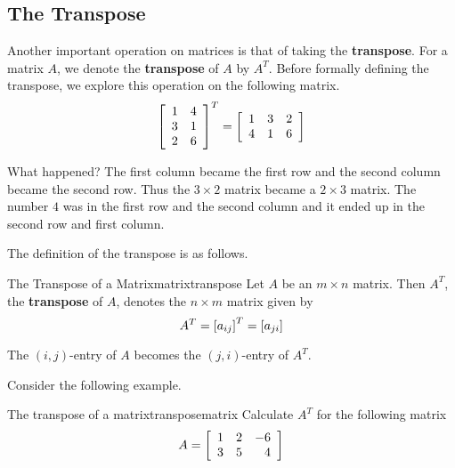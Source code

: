 \subsection{The Transpose}

Another important operation on matrices is that of taking the \textbf{transpose}. For a matrix $A$, we denote the
\textbf{transpose} of $A$ by $A^T$. Before formally defining the transpose, we explore this
operation on the following matrix.
\begin{equation*}
\left[
\begin{array}{cc}
1 & 4 \\
3 & 1 \\
2 & 6
\end{array}
\right] ^{T}=\allowbreak \left[
\begin{array}{ccc}
1 & 3 & 2 \\
4 & 1 & 6
\end{array}
\right]
\end{equation*}

What happened? The first column became the first row and the second column
became the second row. Thus the $3\times 2$ matrix became a $2\times 3$
matrix. The number $4$ was in the first row and the second column and it
ended up in the second row and first column. 

The definition of the transpose is as follows.

\begin{definition}{The Transpose of a Matrix}{matrixtranspose}
Let $A$ be an $m\times n$ matrix. Then $A^{T}$, the \textbf{transpose} of $A$,  denotes the $n\times m$
matrix given by 
\begin{equation*}
A^{T} = \left[ a _{ij}\right] ^{T}= \left[ a_{ji} \right]
\end{equation*}
\end{definition}

The $\left( i, j  \right)$-entry of $A$ becomes the 
$\left( j,i \right)$-entry of $A^T$. 

Consider the following example.

\begin{example}{The transpose of a matrix}{transposematrix}
Calculate $A^T$ for the following matrix
\begin{equation*}
A = \left[
\begin{array}{rrr}
1 & 2 & -6 \\
3 & 5 & 4
\end{array}
\right]
\end{equation*}
\end{example}

